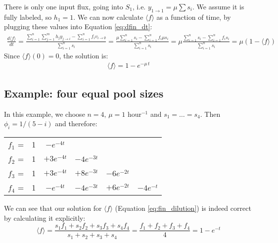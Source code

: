 \documentclass{article}
\newcommand{\fin}{\ensuremath{\langle f \rangle}}
\newcommand{\flux}[2]{\ensuremath{v_{{#1} \rightarrow {#2}}}}
\begin{document}
There is only one input flux, going into $S_1$, i.e. $y_{1 \rightarrow 1} = \mu \sum s_i$. We assume it is fully labeled, so $h_1 = 1$. We can now calculate $\fin$ as a function of time, by plugging these values into Equation \ref{eq:dfin_dt}:
\begin{eqnarray}
	\frac{d\fin}{dt}
	= 
	\frac{\sum_{i=1}^n \sum_{j=1}^m h_j y_{j \rightarrow i} - \sum_{i=1}^n f_i \flux{i}{\emptyset}}{\sum_{i=1}^{n} s_i} 
	=
	\frac{\mu \sum_{i=1}^{n} s_i - \sum_{i=1}^{n} f_i \mu s_i }{\sum_{i=1}^{n} s_i}
	=
	\mu \frac{\sum_{i=1}^{n} s_i - \sum_{i=1}^{n} f_i s_i }{\sum_{i=1}^{n} s_i}
	=
    \mu \left(1 - \fin\right)
\end{eqnarray}
Since $\fin(0) = 0$, the solution is:
\begin{eqnarray}
	\fin = 1 - e^{-\mu\,t} \label{eq:fin_dilution}
\end{eqnarray}


\subsection{Example: four equal pool sizes}
In this example, we choose $n = 4$, $\mu = 1$ hour$^{-1}$ and $s_1 = \ldots = s_4$. Then $\phi_i = 1/(5-i)$ and therefore:
\begin{center}
\begin{tabular}{cccccc}
    $f_1$ = & 1 & $- e^{-4t}$ &&&\\
    $f_2$ = & 1 & $+ 3 e^{-4t}$ & $- 4 e^{-3t}$ &&\\
    $f_3$ = & 1 & $+ 3 e^{-4t}$ & $+ 8 e^{-3t}$ & $- 6 e^{-2t}$ &\\
    $f_4$ = & 1 & $- e^{-4t}$   & $- 4 e^{-3t}$ & $+ 6 e^{-2t}$ & $- 4 e^{-t}$
\end{tabular}
\end{center}

We can see that our solution for $\fin$ (Equation \ref{eq:fin_dilution}) is indeed correct by calculating it explicitly:
\begin{equation}
    \fin = \frac{s_1 f_1 + s_2 f_2 + s_3 f_3 + s_4 f_4}{s_1 + s_2 + s_3 + s_4} = \frac{f_1 + f_2 + f_3 + f_4}{4} = 1 - e^{-t}
\end{equation}
\end{document}
